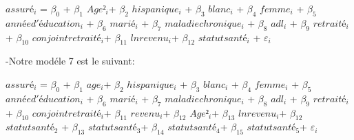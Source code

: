 \documentclass[
  14pt,
  french,
]{article}
\begin{document}
\begin{center}
$assuré_i$ = $\beta_0$  + $\beta_1$ $Age²_i$+ $\beta_2$ $hispanique_i$ + $\beta_3$ $blanc_i$ + $\beta_4$ $femme_i$  + $\beta_{5}$ $année d'éducation_i$ + $\beta_{6}$ $marié_i$ + $\beta_7$ $maladie chronique_i$  + $\beta_{8}$ $adl_i$ + $\beta_{9}$ $retraité_i$ + $\beta_{10}$ $conjoint retraité_i$+ $\beta_{11}$ $lnrevenu_i$+ $\beta_{12}$ $statut santé_i$ + $\varepsilon_i$ 
\end{center}

-Notre modéle 7 est le suivant:

\begin{center}
$assuré_i$ = $\beta_0$  + $\beta_1$ $age_i$+ $\beta_2$ $hispanique_i$ + $\beta_3$ $blanc_i$ + $\beta_4$ $femme_i$  + $\beta_{5}$ $année d'éducation_i$ + $\beta_{6}$ $marié_i$ + $\beta_7$ $maladie chronique_i$  + $\beta_{8}$ $adl_i$ + $\beta_{9}$ $retraité_i$ + $\beta_{10}$ $conjoint retraité_i$+ $\beta_{11}$ $revenu_i$+ $\beta_{12}$ $Age²_i$+ $\beta_{13}$ $lnrevenu_i$+ $\beta_{12}$ $statut santé_2$ + $\beta_{13}$ $statut santé_3$+ $\beta_{14}$ $statut santé_4$+ $\beta_{15}$ $statut santé_5$+ $\varepsilon_i$ 
\end{center}
\end{document}
